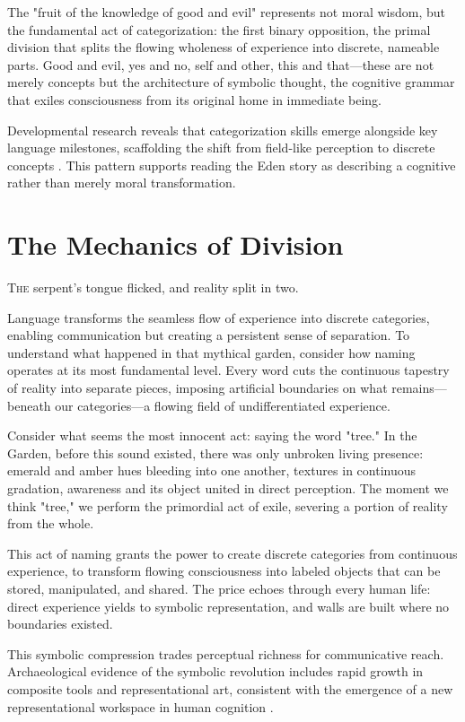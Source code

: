 The "fruit of the knowledge of good and evil" represents not moral wisdom, but the fundamental act of categorization: the first binary opposition, the primal division that splits the flowing wholeness of experience into discrete, nameable parts. Good and evil, yes and no, self and other, this and that—these are not merely concepts but the architecture of symbolic thought, the cognitive grammar that exiles consciousness from its original home in immediate being.

Developmental research reveals that categorization skills emerge alongside key language milestones, scaffolding the shift from field-like perception to discrete concepts \parencite{tomasello2008origins,deacon1997symbolic}. This pattern supports reading the Eden story as describing a cognitive rather than merely moral transformation.

\section{The Mechanics of Division}

\lettrine{T}{he} serpent's tongue flicked, and reality split in two.

Language transforms the seamless flow of experience into discrete categories, enabling communication but creating a persistent sense of separation. To understand what happened in that mythical garden, consider how naming operates at its most fundamental level. Every word cuts the continuous tapestry of reality into separate pieces, imposing artificial boundaries on what remains—beneath our categories—a flowing field of undifferentiated experience.

Consider what seems the most innocent act: saying the word "tree." In the Garden, before this sound existed, there was only unbroken living presence: emerald and amber hues bleeding into one another, textures in continuous gradation, awareness and its object united in direct perception. The moment we think "tree," we perform the primordial act of exile, severing a portion of reality from the whole.

This act of naming grants the power to create discrete categories from continuous experience, to transform flowing consciousness into labeled objects that can be stored, manipulated, and shared. The price echoes through every human life: direct experience yields to symbolic representation, and walls are built where no boundaries existed.

This symbolic compression trades perceptual richness for communicative reach. Archaeological evidence of the symbolic revolution includes rapid growth in composite tools and representational art, consistent with the emergence of a new representational workspace in human cognition \parencite{dunbar1996grooming}.


